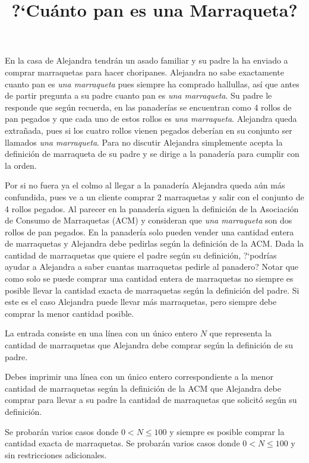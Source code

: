 \documentclass{oci}
\title{?`Cuánto pan es una Marraqueta?}
\begin{document}
\begin{problemDescription}
En la casa de Alejandra tendrán un asado familiar y su padre la ha enviado a comprar marraquetas para hacer choripanes.
Alejandra no sabe exactamente cuanto pan es \textit{una marraqueta} pues siempre ha comprado hallullas, así que antes de partir pregunta a su padre cuanto pan es \textit{una marraqueta}.
Su padre le responde que según recuerda, en las panaderías se encuentran como 4 rollos de pan pegados y que cada uno de estos rollos es \textit{una marraqueta}.
Alejandra queda extrañada, pues si los cuatro rollos vienen pegados deberían en su conjunto ser llamados \textit{una marraqueta}.
Para no discutir Alejandra simplemente acepta la definición de marraqueta de su padre y se dirige a la panadería para cumplir con la orden.

Por si no fuera ya el colmo al llegar a la panadería Alejandra queda aún más confundida, pues ve a un cliente comprar 2 marraquetas y salir con el conjunto de 4 rollos pegados.
Al parecer en la panadería siguen la definición de la Asociación de Consumo de Marraquetas (ACM) y consideran que \textit{una marraqueta} son dos rollos de pan pegados. 
En la panadería solo pueden vender una cantidad entera de marraquetas y Alejandra debe pedirlas según la definición de la ACM\@.
Dada la cantidad de marraquetas que quiere el padre según su definición, ?`podrías ayudar a Alejandra a saber cuantas marraquetas pedirle al panadero?
Notar que como solo se puede comprar una cantidad entera de marraquetas no siempre es posible llevar la cantidad exacta de marraquetas según la definición del padre.
Si este es el caso Alejandra puede llevar más marraquetas, pero siempre debe comprar la menor cantidad posible.

\end{problemDescription}

\begin{inputDescription}
La entrada consiste en una línea con un único entero $N$ que representa la cantidad de marraquetas que Alejandra debe comprar según la definición de su padre.
\end{inputDescription}

\begin{outputDescription}
Debes imprimir una línea con un único entero correspondiente a la menor cantidad de marraquetas según la definición de la ACM que Alejandra debe comprar para llevar a su padre la cantidad de marraquetas que solicitó según su definición.
\end{outputDescription}

\begin{scoreDescription}
   Se probarán varios casos donde $0<N\leq 100$ y siempre es posible comprar la cantidad exacta de marraquetas. 
   Se probarán varios casos donde $0<N\leq 100$ y sin restricciones adicionales.
\end{scoreDescription}

\begin{sampleDescription}
\end{sampleDescription}
\end{document}
